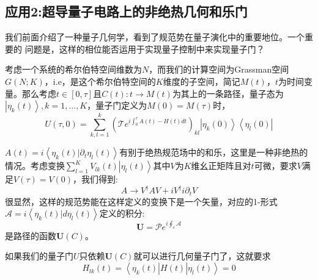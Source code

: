 \documentclass[supercite]{HustGraduPaper}
\newcommand{\bra}[1]{\left\langle #1 \right|}
\newcommand{\ket}[1]{\left| #1 \right\rangle}
\newcommand{\bracket}[2]{\left\langle #1|#2 \right\rangle}
\begin{document}
   
   \subsection{应用2:超导量子电路上的非绝热几何和乐门\label{sec:holo}}
我们前面介绍了一种量子几何学，看到了规范势在量子演化中的重要地位。一个重要的
问题是，这样的相位能否运用于实现量子控制中来实现量子门\cite{recati2002holonomic,duan2001geometric,sjoqvist2012non,zanardi1999holonomic}？

考虑一个系统的希尔伯特空间维数为$N$，而我们的计算空间为Grassman空间$G(N;K)$，i.e，是这个希尔伯特空间的$K$维度的子空间，简记$M(t)$，$t$为时间变量。那么考虑$ t \in [0,\tau]$且$C(t): t \to M(t)$为其上的一条路径，量子态为$\ket{\eta_k(t)}, k = 1,\ldots,K$，量子门定义为$M(0) = M(\tau)$时，
\begin{equation}
U(\tau,0)=\sum_{k,l = 1}^{k} \left(\mathcal{T}e^{i \int_0^\tau A(t) - H(t)dt}\right)_{kl} \ket{\eta_k(0)}\bra{\eta_l(0)}
\end{equation}

$A(t) = i\bracket{\eta_k(t)}{\partial_t \eta_l(t)}$有别于绝热规范场中的和乐，这里是一种非绝热的情况。考虑变换$\sum_{l=1}^K V_{lk}(t)\ket{\eta_l(t)}$其中$V$为$K$维幺正矩阵且对$t$可微，要求$V$满足$V(\tau) = V(0)$，我们得到:
\begin{equation}
A \to V^\dagger A V + i V^\dagger i\partial_t V
\end{equation}
很显然，这样的规范势能在这样定义的变换下是一个矢量，对应的1-形式$\mathcal{A} = i\bracket{\eta_k(t)}{d\eta_l(t)}$定义的积分:
\begin{equation}
\mathbf{U} = \mathcal{P} e^{i \oint_c \mathcal{A}}
\end{equation}
是路径的函数$\mathbf{U}(C)$。

如果我们的量子门$U$只依赖$\mathbf{U}(C)$就可以进行几何量子门了，这就要求
\begin{equation}
\label{eq:require}
H_{lk}(t) = \bra{\eta_k(t)} H(t) \ket{\eta_l(t)} = 0
\end{equation}
\end{document}
